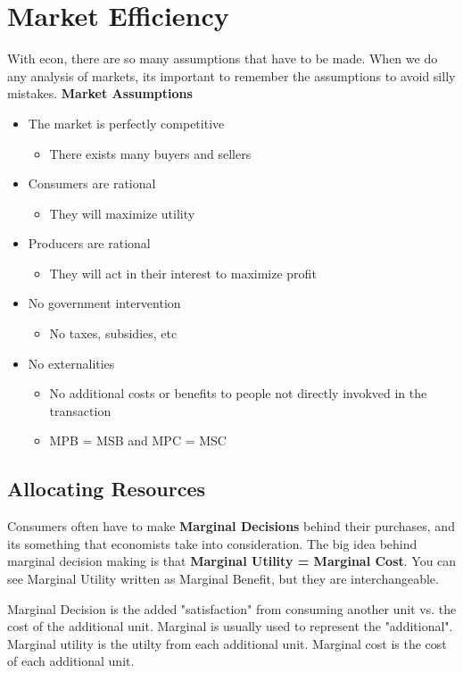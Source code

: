\newpage
\chapter{\normalfont Market Efficiency}
With econ, there are so many assumptions that have to be made. When we do any analysis of markets, its important to remember the assumptions to avoid silly mistakes. 
\textbf{Market Assumptions}
\begin{itemize}
    \item The market is perfectly competitive
        \begin{itemize}
            \item There exists many buyers and sellers
        \end{itemize}
    \item Consumers are rational
        \begin{itemize}
            \item They will maximize utility
        \end{itemize}
    \item Producers are rational
        \begin{itemize}
            \item They will act in their interest to maximize profit
        \end{itemize}
    \item No government intervention
        \begin{itemize}
            \item No taxes, subsidies, etc
        \end{itemize}
    \item No externalities
        \begin{itemize}
            \item No additional costs or benefits to people not directly invokved in the transaction
            \item MPB = MSB and MPC = MSC
        \end{itemize}
\end{itemize}
\section{Allocating Resources}

Consumers often have to make \textbf{Marginal Decisions} behind their purchases, and its something that economists take into consideration. The big idea behind marginal decision making is that \textbf{Marginal Utility = Marginal Cost}. You can see Marginal Utility written as Marginal Benefit, but they are interchangeable.
\begin{definition}
    Marginal Decision is the added "satisfaction" from consuming another unit vs. the cost of the additional unit. Marginal is usually used to represent the "additional". Marginal utility is the utilty from each additional unit. Marginal cost is the cost of each additional unit.
\end{definition}

